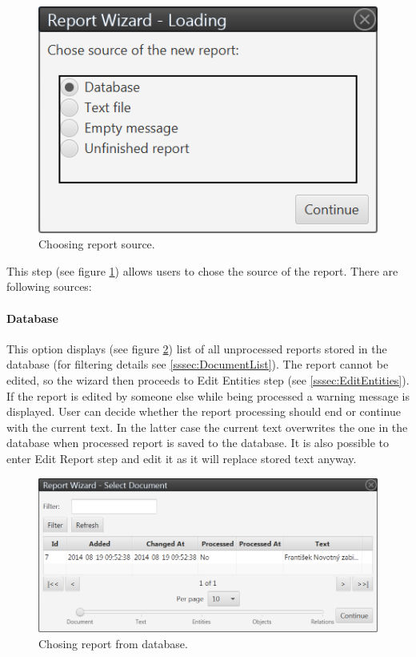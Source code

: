 \begin{figure}[!htb]
        \centering
        \includegraphics{Images/source}
        \caption{Choosing report source.}
        \label{fig:Source}
\end{figure}

This step (see figure \ref{fig:Source}) allows users to chose the source of the
report. There are following sources:

\paragraph{Database} This option displays (see figure \ref{fig:Database}) list
of all unprocessed reports stored in the database (for filtering details see
\ref{sssec:DocumentList}).
The report cannot be edited, so the wizard then proceeds to Edit Entities step
(see \ref{sssec:EditEntities}). If the report is edited by someone else while
being processed a warning message is displayed. User can decide whether the report processing should end or continue with the current text. In the latter case the current text overwrites the one in the database when processed report is saved to the database. It is also possible to enter Edit Report step and edit it as it will replace stored text anyway.

\begin{figure}[!htb]
        \centering
        \includegraphics[width=\textwidth]{Images/database}
        \caption{Chosing report from database.}
        \label{fig:Database}
\end{figure}

